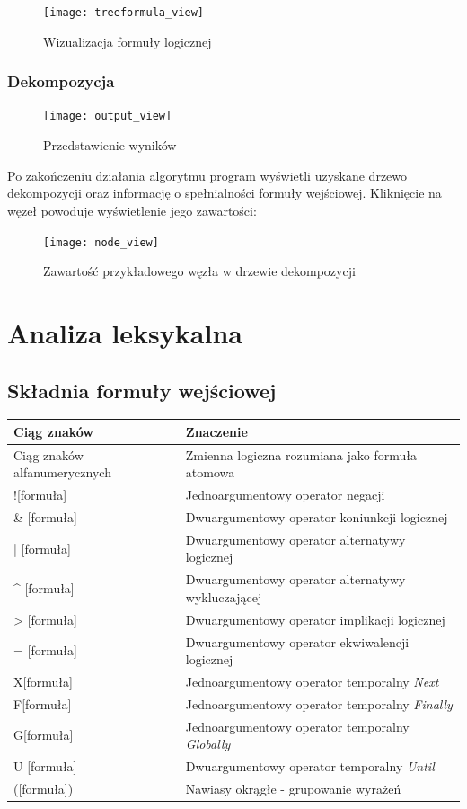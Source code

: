 \documentclass[12pt,a4paper,titlepage]{article}
\begin{document}
\begin{figure}[H]
\centering
\texttt{[image: treeformula\_view]}
\caption{Wizualizacja formuły logicznej}
\end{figure}

\subsubsection{Dekompozycja}
\begin{figure}[H]
\centering
\texttt{[image: output\_view]}
\caption{Przedstawienie wyników}
\end{figure}

Po zakończeniu działania algorytmu program wyświetli uzyskane drzewo dekompozycji oraz informację o spełnialności formuły wejściowej. Kliknięcie na węzeł powoduje wyświetlenie jego zawartości:

\begin{figure}[H]
\centering
\texttt{[image: node\_view]}
\caption{Zawartość przykładowego węzła w drzewie dekompozycji}
\end{figure}

\section{Analiza leksykalna}

\subsection{Składnia formuły wejściowej}
\label{skladnia}
\begin{tabular}{|C{5cm}|C{5cm}|}
  \hline
  \textbf{Ciąg znaków} & \textbf{Znaczenie}\\ 
  \hline 
  Ciąg znaków alfanumerycznych & Zmienna logiczna rozumiana jako formuła atomowa\\
  \hline
  ![formuła] & Jednoargumentowy operator negacji\\
  \hline
  [formuła] \& [formuła] & Dwuargumentowy operator koniunkcji logicznej\\
  \hline
  [formuła] | [formuła] & Dwuargumentowy operator alternatywy logicznej\\
  \hline
  [formuła] \^{} [formuła] & Dwuargumentowy operator alternatywy wykluczającej\\
  \hline
  [formuła] > [formuła] & Dwuargumentowy operator implikacji logicznej\\
  \hline
  [formuła] = [formuła] & Dwuargumentowy operator ekwiwalencji logicznej\\
  \hline
  X[formuła] & Jednoargumentowy operator temporalny \textit{Next}\\
  \hline
  F[formuła] & Jednoargumentowy operator temporalny \textit{Finally}\\
  \hline
  G[formuła] & Jednoargumentowy operator temporalny \textit{Globally}\\
  \hline
  [formuła] U [formuła] & Dwuargumentowy operator temporalny \textit{Until}\\
  \hline
  ([formuła]) & Nawiasy okrągłe - grupowanie wyrażeń\\
  \hline
\end{tabular}
\end{document}
